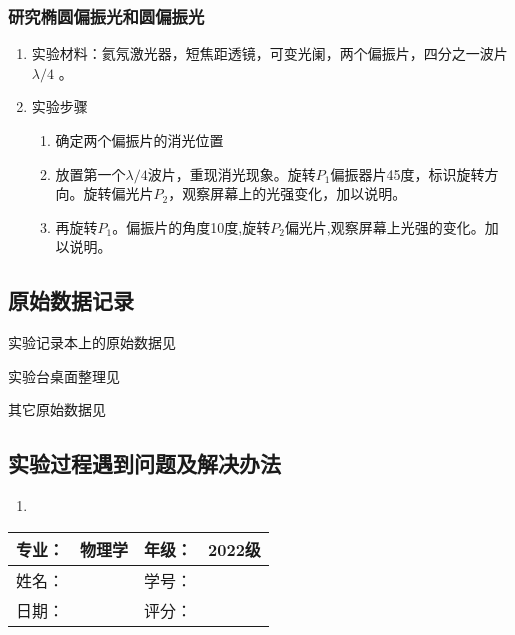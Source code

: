 \documentclass[dvipsnames, svgnames,a4paper,11pt]{article}
\begin{document}
\subsubsection{研究椭圆偏振光和圆偏振光}
\begin{enumerate}
	
	\item 实验材料：氦氖激光器，短焦距透镜，可变光阑，两个偏振片，四分之一波片$\lambda/4$ 。
	\item 实验步骤
   \begin{enumerate}
		\item  确定两个偏振片的消光位置
		\item 放置第一个$\lambda/4$波片，重现消光现象。旋转$P_1$偏振器片45度，标识旋转方向。旋转偏光片$P_2$，观察屏幕上的光强变化，加以说明。

		\item  再旋转$P_1$。偏振片的角度10度,旋转$P_2$偏光片,观察屏幕上光强的变化。加以说明。
		
		
	\end{enumerate}




\end{enumerate}


	
	\clearpage
	\subsection{原始数据记录}
	实验记录本上的原始数据见%
	
	实验台桌面整理见%
	
	其它原始数据见%
	
	\subsection{实验过程遇到问题及解决办法}
	\begin{enumerate}
		\item 
	\end{enumerate}
	
	
	
	\clearpage
	
	\begin{table}
		\renewcommand\arraystretch{1.7}
		\begin{tabularx}{\textwidth}{|X|X|X|X|}
			\hline
			专业：& 物理学 &年级：& 2022级\\
			\hline
			姓名： &  & 学号：& \\
			\hline
			日期：&  & 评分： &\\
			\hline
		\end{tabularx}
	\end{table}
	
\end{document}
